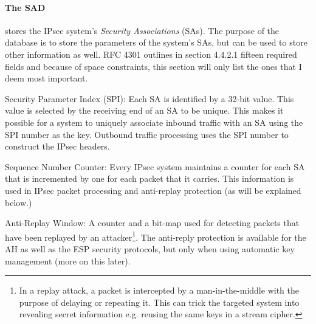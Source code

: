 \documentclass[final,a4paper,twoside,11pt,onecolumn]{report}
\begin{document}



\paragraph{The SAD} stores the IPsec system's \emph{Security Associations} (SAs). The purpose of the database is to store the parameters of the system's SAs, but can be used to store other information as well. RFC 4301 outlines in section 4.4.2.1 fifteen required fields and because of space constraints, this section will only list the ones that I deem most important.

Security Parameter Index (SPI): Each SA is identified by a 32-bit value. This value is selected by the receiving end of an SA to be unique. This makes it possible for a system to uniquely associate inbound traffic with an SA using the SPI number as the key. Outbound traffic processing uses the SPI number to construct the IPsec headers.

Sequence Number Counter: Every IPsec system maintains a counter for each SA that is incremented by one for each packet that it carries. This information is used in IPsec packet processing and anti-replay protection (as will be explained below.)

Anti-Replay Window: A counter and a bit-map used for detecting packets that have been replayed by an attacker\label{mitm}\footnote{In a replay attack, a packet is intercepted by a man-in-the-middle with the purpose of delaying or repeating it. This can trick the targeted system into revealing secret information e.g. reusing the same keys in a stream cipher.}. The anti-reply protection is available for the AH as well as the ESP security protocols, but only when using automatic key management (more on this later).
\end{document}
